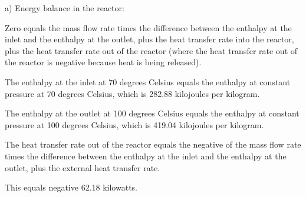 a) Energy balance in the reactor:

Zero equals the mass flow rate times the difference between the enthalpy at the inlet and the enthalpy at the outlet, plus the heat transfer rate into the reactor, plus the heat transfer rate out of the reactor (where the heat transfer rate out of the reactor is negative because heat is being released).

The enthalpy at the inlet at 70 degrees Celsius equals the enthalpy at constant pressure at 70 degrees Celsius, which is 282.88 kilojoules per kilogram.

The enthalpy at the outlet at 100 degrees Celsius equals the enthalpy at constant pressure at 100 degrees Celsius, which is 419.04 kilojoules per kilogram.

The heat transfer rate out of the reactor equals the negative of the mass flow rate times the difference between the enthalpy at the inlet and the enthalpy at the outlet, plus the external heat transfer rate.

This equals negative 62.18 kilowatts.